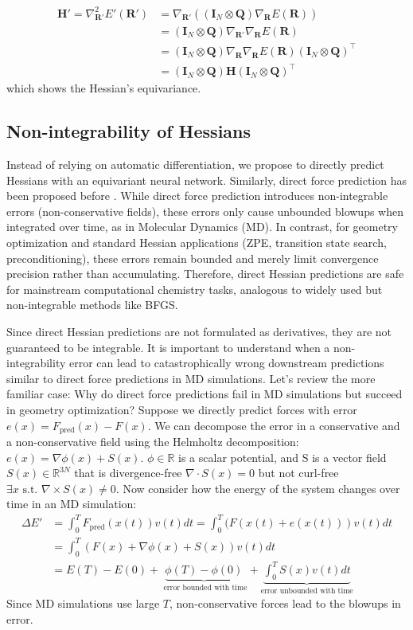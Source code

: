 \documentclass[pdflatex,sn-mathphys-num]{sn-jnl}%
\begin{document}
\begin{align}
    \mathbf{H}' = \nabla^2_\mathbf{R'} E'(\mathbf{R'}) &= \nabla_\mathbf{R'} ((\mathbf{I}_{N} \otimes \mathbf{Q})\nabla_\mathbf{R}E(\mathbf{R})) \\
    &=(\mathbf{I}_{N} \otimes \mathbf{Q})\nabla_\mathbf{R'}\nabla_\mathbf{R}E(\mathbf{R}) \\
    &=(\mathbf{I}_{N} \otimes \mathbf{Q})\nabla_\mathbf{R}\nabla_\mathbf{R}E(\mathbf{R}) (\mathbf{I}_{N} \otimes \mathbf{Q})^\top \\
    &=(\mathbf{I}_{N} \otimes \mathbf{Q})\mathbf{H} (\mathbf{I}_{N} \otimes \mathbf{Q})^\top
\end{align}
which shows the Hessian's equivariance. 

\subsection{Non-integrability of Hessians\label{sec:conservative}}
Instead of relying on automatic differentiation, we propose to directly predict Hessians with an equivariant neural network. Similarly, direct force prediction has been proposed before \citep{gasteiger2021, liao2023equiformerv2}. 
While direct force prediction introduces non-integrable errors (non-conservative fields), these errors only cause unbounded blowups when integrated over time, as in Molecular Dynamics (MD). In contrast, for geometry optimization and standard Hessian applications (ZPE, transition state search, preconditioning), these errors remain bounded and merely limit convergence precision rather than accumulating. Therefore, direct Hessian predictions are safe for mainstream computational chemistry tasks, analogous to widely used but non-integrable methods like BFGS.

Since direct Hessian predictions are not formulated as derivatives, they are not guaranteed to be integrable. It is important to understand when a non-integrability error can lead to catastrophically wrong downstream predictions similar to direct force predictions in MD simulations. 
Let's review the more familiar case: Why do direct force predictions fail in MD simulations but succeed in geometry optimization? Suppose we directly predict forces with error $e(x)=F_\text{pred}(x) - F(x)$. We can decompose the error in a conservative and a non-conservative field using the Helmholtz decomposition: $e(x) = \nabla \phi(x) + S(x)$. $\phi\in \mathbb{R}$ is a scalar potential, and S is a vector field $S(x) \in \mathbb{R}^{3N}$ that is divergence-free $\nabla \cdot S(x) = 0$ but not curl-free $\exists x \text{ s.t. } \nabla \times S(x) \neq 0$.
Now consider how the energy of the system changes over time in an MD simulation:
$$
\begin{aligned}
\Delta E' &= \int_0^T F_\text{pred}(x(t)) v(t) dt = \int_0^T (F(x(t) + e(x(t))) v(t) dt \\
&= \int_0^T (F(x) + \nabla \phi(x) + S(x))v(t) dt \\ 
&= E(T) - E(0) + \underbrace{\phi(T) - \phi(0)}_{\text{ error bounded with time}} + \underbrace{\int_0^T S(x) v(t) dt}_{\text{error unbounded with time}}
\end{aligned}
$$
Since MD simulations use large $T$, non-conservative forces lead to the blowups in error. 
\end{document}
